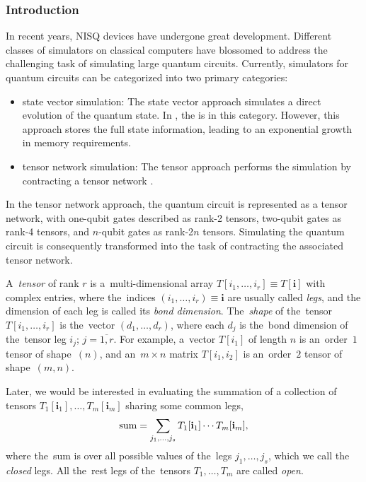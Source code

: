 \subsubsection{Introduction}
In recent years, NISQ devices have undergone great development. Different classes of simulators on classical computers have blossomed to address the challenging task of simulating large quantum circuits. Currently, simulators for quantum circuits can be categorized into two primary categories:
\begin{itemize}
    \item state vector simulation: The state vector approach simulates a direct evolution of the quantum state. In \MindQuantum, the  is in this category. However, this approach stores the full state information, leading to an exponential growth in memory requirements.
    \item tensor network simulation: The tensor approach performs the simulation by contracting a tensor network .
\end{itemize}

In the tensor network approach, the quantum circuit is represented as a tensor network, with one-qubit gates described as rank-2 tensors, two-qubit gates as rank-4 tensors, and $n$-qubit gates as rank-2$n$ tensors. Simulating the quantum circuit is consequently transformed into the task of contracting the associated tensor network.

A~\emph{tensor} of rank $r$ is a~multi-dimensional array $T[i_1,\dots,i_r] \equiv T[\mathbf{i}]$ with complex entries, where the~indices $(i_1,\dots,i_r) \equiv \mathbf{i}$ are usually called \emph{legs}, and the dimension of each leg is called its \emph{bond dimension}. The~\emph{shape} of the~tensor $T[i_1,\dots,i_r]$ is the~vector $(d_1,\dots,d_r)$, where each $d_j$ is the~bond dimension of the~tensor leg $i_j$;  $j=\overline{1,r}$. For example, a~vector $T[i_1]$ of length $n$ is an~order~$1$ tensor of shape~$(n)$, and an~$m\times n$ matrix $T[i_1,i_2]$ is an~order~$2$ tensor of shape~$(m, n)$.

Later, we would be interested in evaluating the summation of a collection of tensors $T_1[\mathbf{i}_1],\dots, T_m[\mathbf{i}_m]$ sharing some common legs,
\begin{equation}\label{eq:sum}
    {\rm{sum}}=\sum_{j_1,\dots,j_s} T_1[\mathbf{i}_1]\cdots T_m[\mathbf{i}_m],
\end{equation}
where the~sum is over all possible values of the~legs $j_1,\dots,j_s$, which we call the \emph{closed} legs. All the~rest legs of the~tensors $T_1,\dots,T_m$ are called \emph{open}.

